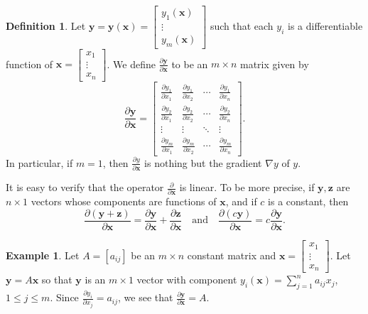 \documentclass[12pt,letterpaper]{book}
\numberwithin{equation}{section}
\theoremstyle{definition}
\newtheorem{defi}[thm]{\textbf{Definition}}
\newtheorem{example}[thm]{\textbf{Example}}
\newcommand{\vx}{\bm{x}}
\newcommand{\vy}{\bm{y}}
\newcommand{\vz}{\bm{z}}
\begin{document}
\begin{defi}
Let $\vy=\vy(\vx)=\left[\begin{array}{c} y_1(\vx) \\ \vdots \\ y_m(\vx) \end{array}\right]$ such that each $y_i$ is a differentiable function of $\vx=\left[\begin{array}{c} x_1 \\ \vdots \\ x_n \end{array}\right]$. We define $\frac{\partial \vy}{\partial \vx}$ to be an $m\times n$ matrix given by
$$\frac{\partial \vy}{\partial \vx} = \left[\begin{array}{cccc} \frac{\partial y_1}{\partial x_1} & \frac{\partial y_1}{\partial x_2} & \cdots & \frac{\partial y_1}{\partial x_n} \\
\frac{\partial y_2}{\partial x_1} & \frac{\partial y_2}{\partial x_2} & \cdots & \frac{\partial y_2}{\partial x_n} \\
\vdots & \vdots & \ddots & \vdots \\
\frac{\partial y_m}{\partial x_1} & \frac{\partial y_m}{\partial x_2} & \cdots & \frac{\partial y_m}{\partial x_n}
\end{array}\right].$$
In particular, if $m=1$, then $\frac{\partial y}{\partial \vx}$ is nothing but the gradient $\nabla y$ of $y$.
\end{defi}

It is easy to verify that the operator $\frac{\partial}{\partial \vx}$ is linear. To be more precise, if $\vy,\vz$ are $n\times 1$ vectors whose components are functions of $\vx$, and if $c$ is a constant, then
\begin{equation}\label{mat-linear}\frac{\partial (\vy+\vz)}{\partial \vx}=\frac{\partial \vy}{\partial \vx}+\frac{\partial \vz}{\partial \vx}\quad\text{and}\quad \frac{\partial (c\vy)}{\partial \vx}=c\frac{\partial \vy}{\partial \vx}.\end{equation}

\begin{example}\label{matdiffCR}
Let $A=[a_{ij}]$ be an $m\times n$ constant matrix and $\vx=\left[\begin{array}{c} x_1 \\ \vdots \\ x_n \end{array}\right]$. Let $\vy=A\vx$ so that $\vy$ is an $m\times 1$ vector with component $y_i(\vx)=\sum_{j=1}^na_{ij}x_j$, $1\leq j\leq m$. Since $\frac{\partial y_i}{\partial x_j}=a_{ij}$, we see that $\frac{\partial \vy}{\partial \vx} = A$.
\end{example}
\end{document}
